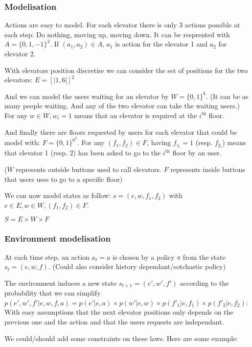 \documentclass[a4paper]{article}
\begin{document}
\subsubsection*{Modelisation}
Actions are easy to model. For each elevator there is only 3 actions possible at each step: Do nothing, moving up, moving down. It can be resprented
with $A = \{0, 1, -1\}^2$. If $(a_1, a_2) \in A$, $a_1$ is action for the elevator 1 and $a_2$ for elevator 2.

With elevators position discretise we can consider the set of positions for the two elevators: $E = [|1, 6|]^2$

And we can model the users waiting for an elevator by $W = \{0,1\}^6$. (It can be as many people waiting. And any of the two elevator can take the
waiting users.) For any $w \in W, w_i = 1$ means that an elevator is required at the $i^{\text{th}}$ floor.

And finally there are floors requested by users for each elevator that could be model with: $F = \{0,1\}^{6^2}$. For any $(f_1, f_2) \in F$, having
$f_{1_i} = 1$ (resp. $f_{2_i}$) means that elevator 1 (resp. 2) has been asked to go to the $i^{\text{th}}$ floor by an user.

($W$ represents outside buttons used to call elevators. $F$ represents inside buttons that users uses to go to a specific floor)

We can now model states as follow: $s = (e, w, f_1, f_2)$ with $e \in E, w \in W, (f_1, f_2) \in F$.

$S = E \times W \times F$

\subsubsection*{Environment modelisation}

At each time step, an action $a_t = a$ is chosen by a policy $\pi$ from the state $s_t = (e, w, f)$. (Could also consider history dependant/sotchastic policy)

The environment induces a new state $s_{t+1} = (e', w', f')$ according to the probability that we can simplify
$p(e', w', f'|e, w, f, a) = p(e'|e, a) \times p(w'|e, w) \times p(f'_1|e, f_1) \times p(f'_2|e, f_2)$: With easy assumptions that the next elevator
positions only depends on the previous one and the action and that the users requests are independant.

We could/should add some constraints on these laws. Here are some example:
\end{document}
